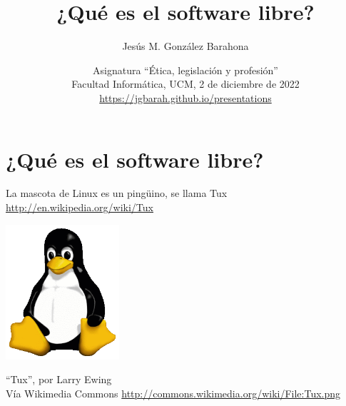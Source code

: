 \documentclass[17pt,aspectratio=169]{beamer}
\begin{document}
\title{¿Qué es el software libre?}
\author{Jesús M. González Barahona}

\date{Asignatura ``Ética, legislación y profesión'' \\
  Facultad Informática, UCM, 2 de diciembre de 2022\\
{\small \url{https://jgbarah.github.io/presentations}} \\}

\frame{
\maketitle
}




\section{¿Qué es el software libre?}


\begin{frame}

{\small
La mascota de Linux es un pingüino, se llama Tux \\
\url{http://en.wikipedia.org/wiki/Tux} \\
}

\begin{flushright}
\includegraphics[height=5cm]{figs/tux}

{\footnotesize
``Tux'', por Larry Ewing \\
  Vía Wikimedia Commons \url{http://commons.wikimedia.org/wiki/File:Tux.png}
}
\end{flushright}

\end{frame}
\end{document}
